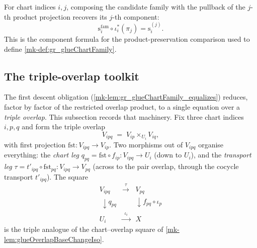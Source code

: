 \begin{lemma}\label{mk-lem:gr_glueChartFamily_pullback_map_pi}
  \leanok

  For chart indices \(i,j\), composing the candidate family with the pullback of the
  \(j\)-th product projection recovers its \(j\)-th component:
  \[
    \mathrm{s}_i^{\mathrm{fam}}\circ
      \iota_i^*(\pi_j)=\mathrm{s}_i^{(j)}.
  \]
  This is the component formula for the product-preservation comparison used to
  define \ref{mk-def:gr_glueChartFamily}.
\end{lemma}

\subsection{The triple-overlap toolkit}

The first descent obligation (\ref{mk-lem:gr_glueChartFamily_equalizes}) reduces, factor
by factor of the restricted overlap product, to a single equation over a \emph{triple
overlap}. This subsection records that machinery. Fix three chart indices \(i, p, q\)
and form the triple overlap
\[
  V_{ipq} \;=\; V_{ip} \times_{U_i} V_{iq},
\]
with first projection \(\mathrm{fst} : V_{ipq} \to V_{ip}\). Two morphisms out of
\(V_{ipq}\) organise everything: the \emph{chart leg}
\(q_{pq} = \mathrm{fst}\circ f_{ip} : V_{ipq} \to U_i\) (down to \(U_i\)), and the
\emph{transport leg} \(\tau = t'_{ipq}\circ \mathrm{fst}_{pq} : V_{ipq} \to V_{pq}\)
(across to the pair overlap, through the cocycle transport \(t'_{ipq}\)). The square
\[
  \begin{array}{ccc}
    V_{ipq} & \xrightarrow{\ \ \tau\ \ } & V_{pq} \\
    \ \downarrow{\scriptstyle q_{pq}} & & \downarrow{\scriptstyle f_{pq}\circ \iota_p} \\
    U_i & \xrightarrow{\ \ \iota_i\ \ } & X
  \end{array}
\]
is the triple analogue of the chart--overlap square of \ref{mk-lem:glueOverlapBaseChangeIso}.

